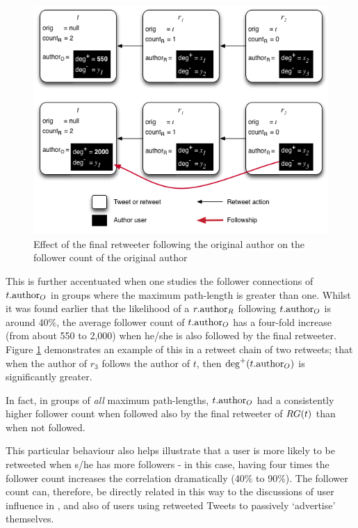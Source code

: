 \begin{figure}[h]
\centering
\includegraphics[scale=0.7]{3.Chapter1/Media/final_following_original.png} 
\caption{Effect of the final retweeter following the original author on the follower count of the original author}
\label{fig:final_following_original}
\end{figure}

This is further accentuated when one studies the follower connections of $t.\textrm{author}_O$ in groups where the maximum path-length is greater than one. Whilst it was found earlier that the likelihood of a $r.\textrm{author}_R$ following $t.\textrm{author}_O$ is around 40\%, the average follower count of $t.\textrm{author}_O$ has a four-fold increase (from about 550 to 2,000) when he/she is also followed by the final retweeter. Figure \ref{fig:final_following_original} demonstrates an example of this in a retweet chain of two retweets; that when the author of $r_3$ follows the author of $t$, then $\textrm{deg}^+(t.\textrm{author}_O)$ is significantly greater. 

In fact, in groups of \textit{all} maximum path-lengths, $t.\textrm{author}_O$ had a consistently higher follower count when followed also by the final retweeter of $RG(t)$ than when not followed.

This particular behaviour also helps illustrate that a user is more likely to be retweeted when s/he has more followers - in this case, having four times the follower count increases the correlation dramatically (40\% to 90\%). The follower count can, therefore, be directly related in this way to the discussions of user influence in \cite{cha10}, and also of users using retweeted Tweets to passively `advertise' themselves.

